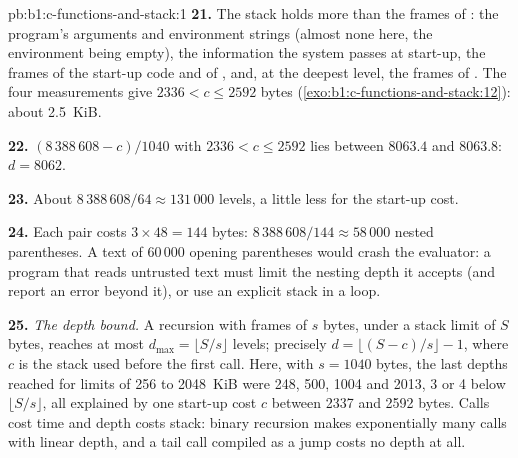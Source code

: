 \begin{solution}{pb:b1:c-functions-and-stack:1}
\textbf{21.} The stack holds more than the frames of : the program's arguments and environment strings
(almost none here, the environment being empty), the information the system passes at start-up, the frames of the
start-up code and of , and, at the deepest level, the frames of . The four measurements give
$2336 < c \leq 2592$ bytes (\cref{exo:b1:c-functions-and-stack:12}): about 2.5~KiB.

\textbf{22.} $(8\,388\,608 - c)/1040$ with $2336 < c \leq 2592$ lies between $8063.4$ and $8063.8$: $d = 8062$.

\textbf{23.} About $8\,388\,608/64 \approx 131\,000$ levels, a little less for the start-up cost.

\textbf{24.} Each pair costs $3 \times 48 = 144$ bytes: $8\,388\,608 / 144 \approx 58\,000$ nested parentheses.
A text of 60\,000 opening parentheses would crash the evaluator: a program that reads untrusted text must limit
the nesting depth it accepts (and report an error beyond it), or use an explicit stack in a loop.

\textbf{25.} \emph{The depth bound.} A recursion with frames of $s$ bytes, under a stack limit of $S$ bytes, reaches
at most $d_{\max} = \lfloor S/s \rfloor$ levels; precisely $d = \lfloor (S - c)/s \rfloor - 1$, where $c$ is
the stack used before the first call. Here, with $s = 1040$ bytes, the last depths reached for limits of 256 to
2048~KiB were 248, 500, 1004 and 2013, 3 or 4 below $\lfloor S/s \rfloor$, all explained by one start-up cost $c$
between 2337 and 2592 bytes. Calls cost time and depth costs stack: binary recursion
makes exponentially many calls with linear depth, and a tail call compiled as a jump costs no depth at all.
\end{solution}

